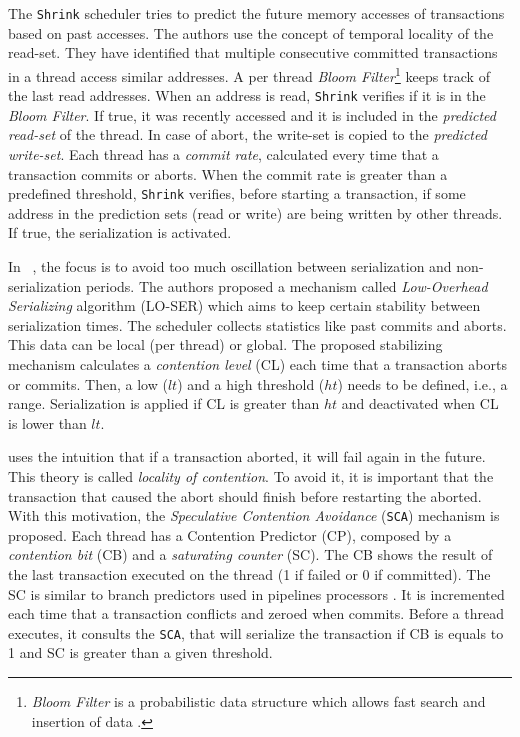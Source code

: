 The \texttt{Shrink} scheduler \cite{Shrink} tries to predict the future memory accesses of transactions based on past accesses. The authors use the concept of temporal locality of the read-set. They have identified that multiple consecutive committed transactions in a thread access similar addresses. A per thread \textit{Bloom Filter}\footnote{\textit{Bloom Filter} is a probabilistic data structure which allows fast search and insertion of data \cite{Bloom:1970}.} keeps track of the last read addresses. When an address is read, \texttt{Shrink} verifies if it is in the \textit{Bloom Filter}. If true, it was recently accessed and it is included in the \emph{predicted read-set} of the thread. In case of abort, the write-set is copied to the \emph{predicted write-set}. Each thread has a \emph{commit rate}, calculated every time that a transaction commits or aborts. When the commit rate is greater than a predefined threshold, \texttt{Shrink} verifies, before starting a transaction, if some address in the prediction sets (read or write) are being written by other threads. If true, the serialization is activated. 

In ~\citeyearpar{Heber:2009,Heber:2012}, the focus is to avoid too much oscillation between serialization and non-serialization periods. The authors proposed a mechanism called \emph{Low-Overhead Serializing} algorithm (LO-SER) which aims to keep certain stability between serialization times. The scheduler collects statistics like past commits and aborts. This data can be local (per thread) or global. The proposed stabilizing mechanism calculates a \emph{contention level} (CL) each time that a transaction aborts or commits. Then, a low ($lt$) and a high threshold ($ht$) needs to be defined, i.e., a range. Serialization is applied if CL is greater than $ht$ and deactivated when CL is lower than $lt$. 

 uses the intuition that if a transaction aborted, it will fail again in the future. This theory is called \emph{locality of contention}. To avoid it, it is important that the transaction that caused the abort should finish before restarting the aborted. With this motivation, the \emph{Speculative Contention Avoidance} (\texttt{SCA}) mechanism is proposed. Each thread has a Contention Predictor (CP), composed by a \emph{contention bit} (CB) and a \emph{saturating counter} (SC). The CB shows the result of the last transaction executed on the thread (1 if failed or 0 if committed). The SC is similar to branch predictors used in pipelines processors \cite{Yeh:1992}. It is incremented each time that a transaction conflicts and zeroed when commits. Before a thread executes, it consults the \texttt{SCA}, that will serialize the transaction if CB is equals to 1 and SC is greater than a given threshold. 


